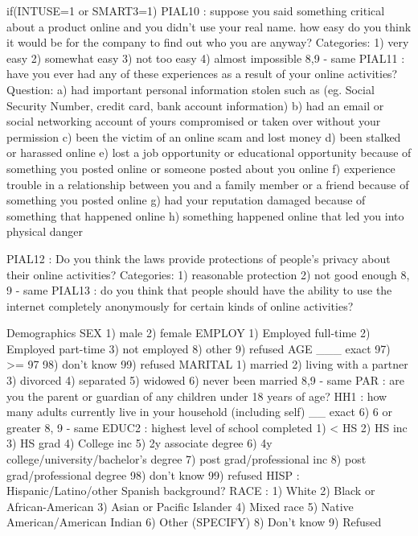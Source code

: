     if(INTUSE=1 or SMART3=1)
    PIAL10  : suppose you said something critical about a product online and you didn't use
                your real name. how easy do you think it would be for the company to find out
                who you are anyway?
        Categories:
            1) very easy
            2) somewhat easy
            3) not too easy
            4) almost impossible
            8,9 - same
    PIAL11  : have you ever had any of these experiences as a result of your online activities?
        Question:
            a) had important personal information stolen such as (eg. Social Security Number,
                credit card, bank account information)
            b) had an email or social networking account of yours compromised or taken over without
                your permission
            c) been the victim of an online scam and lost money
            d) been stalked or harassed online
            e) lost a job opportunity or educational opportunity because of something you posted
                online or someone posted about you online
            f) experience trouble in a relationship between you and a family member or a friend because
                of something you posted online
            g) had your reputation damaged because of something that happened online
            h) something happened online that led you into physical danger

    
    PIAL12  : Do you think the laws provide protections of people's privacy about their
                online activities?
        Categories:
            1) reasonable protection
            2) not good enough
            8, 9 - same
    PIAL13  : do you think that people should have the ability to use the internet completely
                anonymously for certain kinds of online activities?

    Demographics
        SEX
            1) male
            2) female
        EMPLOY
            1) Employed full-time
            2) Employed part-time
            3) not employed
            8) other
            9) refused
        AGE
            ___ exact
            97) >= 97
            98) don't know
            99) refused
        MARITAL
            1) married
            2) living with a partner
            3) divorced
            4) separated
            5) widowed
            6) never been married
            8,9 - same
        PAR : are you the parent or guardian of any children under 18 years of age?
        HH1 : how many adults currently live in your household (including self)
            __ exact
            6) 6 or greater
            8, 9 - same
        EDUC2   : highest level of school completed
            1) < HS
            2) HS inc
            3) HS grad
            4) College inc
            5) 2y associate degree
            6) 4y college/university/bachelor's degree
            7) post grad/professional inc
            8) post grad/professional degree
            98) don't know
            99) refused
        HISP    : Hispanic/Latino/other Spanish background?
        RACE    :
            1) White
            2) Black or African-American
            3) Asian or Pacific Islander
            4) Mixed race
            5) Native American/American Indian
            6) Other (SPECIFY)
            8) Don’t know
            9) Refused


